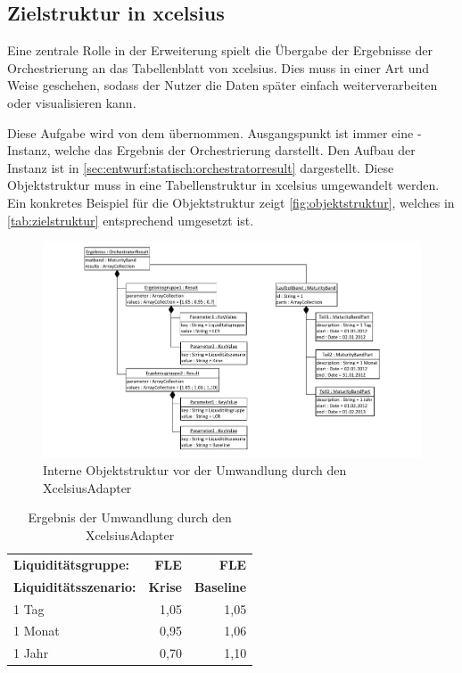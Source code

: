 \begin{onehalfspacing}
\subsection{Zielstruktur in \gls{xcelsius}}
Eine zentrale Rolle in der Erweiterung spielt die Übergabe der Ergebnisse der Orchestrierung an das Tabellenblatt von \gls{xcelsius}. Dies muss in einer Art und Weise geschehen, sodass der Nutzer die Daten später einfach weiterverarbeiten oder visualisieren kann.

Diese Aufgabe wird von dem  übernommen. Ausgangspunkt ist immer eine -Instanz, welche das Ergebnis der Orchestrierung darstellt. Den Aufbau der Instanz ist in \vref{sec:entwurf:statisch:orchestratorresult} dargestellt. Diese Objektstruktur muss in eine Tabellenstruktur in \gls{xcelsius} umgewandelt werden. Ein konkretes Beispiel für die Objektstruktur zeigt \vref{fig:objektstruktur}, welches in \vref{tab:zielstruktur} entsprechend umgesetzt ist.

\begin{figure}[ht]
\centering
\setlength{\unitlength}{1mm}
\includegraphics[width=15cm]{Visio/Entwurf-Objektstruktur.pdf}
\caption{Interne Objektstruktur vor der Umwandlung durch den Xcel\-si\-us\-Adap\-ter \label{fig:objektstruktur}}
\end{figure} 

\begin{table}[ht]
  \centering
  \caption{Ergebnis der Umwandlung durch den XcelsiusAdapter}
    \begin{tabular}{l|r|r}
    \toprule
    \textbf{Liquiditätsgruppe:} & \textbf{FLE} & \textbf{FLE} \\
    \textbf{Liquiditätsszenario:} & \textbf{Krise} & \textbf{Baseline} \\
    \midrule
    1 Tag & 1,05  & 1,05 \\
    1 Monat & 0,95  & 1,06 \\
    1 Jahr & 0,70  & 1,10 \\
    \bottomrule
    \end{tabular}%
  \label{tab:zielstruktur}%
\end{table}%


\end{onehalfspacing}
